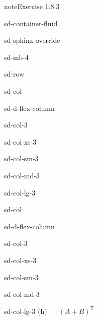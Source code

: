 \documentclass[letterpaper,10pt,english]{jupyterBook}
\begin{document}
\begin{sphinxadmonition}{note}{Exercise 1.8.3}
\begin{sphinxuseclass}{sd-container-fluid}
\begin{sphinxuseclass}{sd-sphinx-override}
\begin{sphinxuseclass}{sd-mb-4}
\begin{sphinxuseclass}{sd-row}
\begin{sphinxuseclass}{sd-col}
\begin{sphinxuseclass}{sd-d-flex-column}
\begin{sphinxuseclass}{sd-col-3}
\begin{sphinxuseclass}{sd-col-xs-3}
\begin{sphinxuseclass}{sd-col-sm-3}
\begin{sphinxuseclass}{sd-col-md-3}
\begin{sphinxuseclass}{sd-col-lg-3}
\end{sphinxuseclass}
\end{sphinxuseclass}
\end{sphinxuseclass}
\end{sphinxuseclass}
\end{sphinxuseclass}
\end{sphinxuseclass}
\end{sphinxuseclass}
\begin{sphinxuseclass}{sd-col}
\begin{sphinxuseclass}{sd-d-flex-column}
\begin{sphinxuseclass}{sd-col-3}
\begin{sphinxuseclass}{sd-col-xs-3}
\begin{sphinxuseclass}{sd-col-sm-3}
\begin{sphinxuseclass}{sd-col-md-3}
\begin{sphinxuseclass}{sd-col-lg-3}
\sphinxAtStartPar
(h)   \((A + B)^\mathsf{T}\)

\end{sphinxuseclass}
\end{sphinxuseclass}
\end{sphinxuseclass}
\end{sphinxuseclass}
\end{sphinxuseclass}
\end{sphinxuseclass}
\end{sphinxuseclass}
\end{sphinxuseclass}
\end{sphinxuseclass}
\end{sphinxuseclass}
\end{sphinxuseclass}\end{sphinxadmonition}
 \label{exercise:matrices-ex3}
\end{document}

